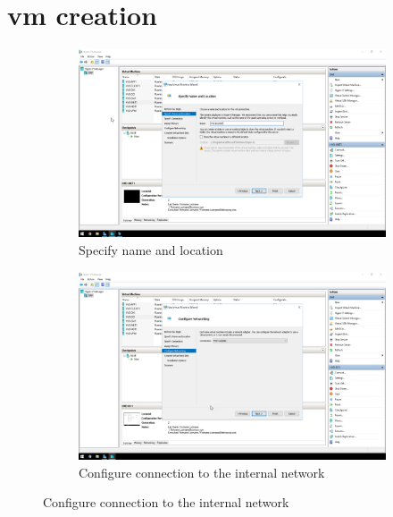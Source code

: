 \label{Migration}
\section{\acrfull{vm} creation}
\begin{figure}[!htb]
	\begin{subfigure}{0.5\textwidth}
		\captionsetup{width=0.8\linewidth}
		\includegraphics[width=0.9\linewidth]{img/Methodologie/Migration0.png}
		\centering
		\caption{Specify name and location}
	\end{subfigure}
	\begin{subfigure}{0.5\textwidth}
		\captionsetup{width=0.8\linewidth}
		\includegraphics[width=0.9\linewidth]{img/Methodologie/Migration1.png} 
		\centering
		\caption{Configure connection to the internal network}
	\end{subfigure}
\end{figure}
